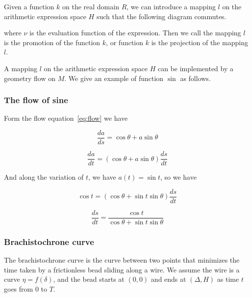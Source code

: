 \begin{definition}\label{def:projection}
Given a function $k$ on the real domain $R$, we can introduce a mapping $l$ on the arithmetic expression space $H$ such that the following diagram commutes.

\begin{center}
\end{center}

where $\nu$ is the evaluation function of the expression. Then we call the mapping $l$ is the promotion of the function $k$,
or function $k$ is the projection of the mapping $l$.
\end{definition}

A mapping $l$ on the arithmetic expression space $H$ can be implemented by a geometry flow on $M$.
We give an example of function $\sin$ as follows.

\subsubsection{The flow of sine}\label{subsubsec:flow-of-sine}

Form the flow equation~\eqref{eq:flow} we have

$$\frac{da}{ds} = \cos \theta + a \sin \theta$$

$$\frac{da}{dt} = (\cos \theta + a \sin \theta)\frac{ds}{dt}$$

And along the variation of $t$, we have $a(t) = \sin t$, so we have

$$\cos t = (\cos \theta + \sin t \sin \theta)\frac{ds}{dt}$$

$$\frac{ds}{dt} = \frac{\cos t}{\cos \theta + \sin t \sin \theta}$$

\subsubsection{Brachistochrone curve}\label{subsubsec:brachistochrone}

The brachistochrone curve is the curve between two points that minimizes the time taken by a frictionless bead sliding along a wire.
We assume the wire is a curve $\eta = f(\delta)$, and the bead starts at $(0, 0)$ and ends at $( \Delta, H )$ as time $t$ goes from $0$ to $T$.

